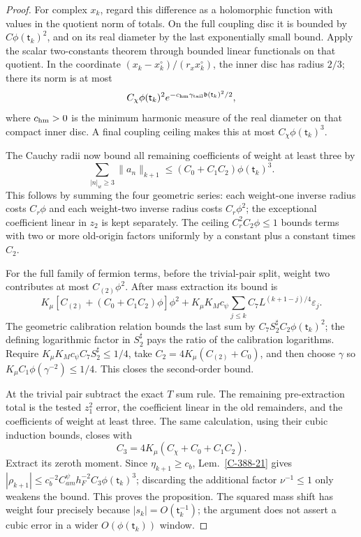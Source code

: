 \documentclass[11pt,letterpaper,reqno]{amsart}
\theoremstyle{definition}
\theoremstyle{remark}
\begin{document}
\begin{proof}
For complex $x_k$, regard this difference as a holomorphic
function with values in the quotient norm of totals.
On the full coupling disc it is bounded by
$C\phi(\mathsf t_k)^2$, and on its real diameter by the last
exponentially small bound.  Apply the scalar two-constants
theorem through bounded linear functionals on that
quotient. In the coordinate $(x_k-x_k^\circ)/(r_xx_k^\circ)$,
the inner disc has radius $2/3$; there its norm is
at most
\[
 C_\chi\phi(\mathsf t_k)^2
     e^{-c_{\rm hm}\gamma_{\rm tail}\mathfrak b(\mathsf t_k)^2/2},
\]
where $c_{\rm hm}>0$ is the minimum harmonic measure of
the real diameter on that compact inner disc.  A final
coupling ceiling makes this at most
$C_\chi\phi(\mathsf t_k)^3$.

The Cauchy radii now bound all remaining coefficients
of weight at least three by
\[
 \sum_{|n|_w\ge3}\|a_n\|_{k+1}
                         \le(C_0+C_1C_2)\phi(\mathsf t_k)^3.
\]
This follows by summing the four geometric series:
each weight-one inverse radius costs $C_r\phi$ and
each weight-two inverse radius costs $C_r\phi^2$;
the exceptional coefficient linear in $z_2$ is kept
separately.  The ceiling $C_r^2C_2\phi\le1$ bounds
terms with two or more old-origin factors uniformly
by a constant plus a constant times $C_2$.

For the full family of fermion terms, before the
trivial-pair split, weight two contributes at most
$C_{(2)}\phi^2$.  After mass extraction its bound is
\[
 K_\mu[C_{(2)}+(C_0+C_1C_2)\phi]\phi^2+
 K_\mu K_Mc_\psi\sum_{j\le k}C_7L^{(k+1-j)/4}
                                    \varepsilon_j.
\]
The geometric calibration relation bounds the last
sum by $C_7S_2^\sharp C_2\phi(\mathsf t_k)^2$; the defining
logarithmic factor in $S_2^\sharp$ pays the ratio of the
calibration logarithms.
Require $K_\mu K_Mc_\psi C_7S_2^\sharp\le1/4$,
take $C_2=4K_\mu(C_{(2)}+C_0)$, and then choose
$\gamma$ so $K_\mu C_1\phi(\gamma^{-2})\le1/4$.
This closes the second-order bound.

At the trivial pair subtract the exact $T$ sum rule.
The remaining pre-extraction total is the tested
$z_1^2$ error, the coefficient linear in the old
remainders, and the coefficients of weight at least
three.  The same calculation, using their cubic
induction bounds, closes with
\[
 C_3=4K_\mu(C_\chi+C_0+C_1C_2).
\]
Extract its zeroth moment.  Since $\eta_{k+1}\ge c_b$,
Lem.~\ref{C-388-21} gives
$|\rho_{k+1}|\le
c_b^{-2}C^\psi_{am}h_F^{-2}C_3\phi(\mathsf t_k)^3$;
discarding the additional factor $\nu^{-1}\le1$
only weakens the bound.  This proves the proposition.
The squared mass shift has weight four precisely
because $|s_k|=O(\mathsf t_k^{-1})$; the argument does not
assert a cubic error in a wider $O(\phi(\mathsf t_k))$ window.


\end{proof}
\end{document}
